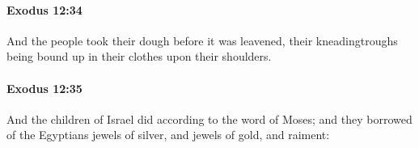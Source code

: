 		\paragraph{Exodus 12:34} %
			\label{EXODUS-12-34}

			And the people took their dough before it was leavened, their kneadingtroughs being bound up in their clothes upon their shoulders.


		\paragraph{Exodus 12:35} %
			\label{EXODUS-12-35}

			And the children of Israel did according to the word of Moses; and they borrowed of the Egyptians jewels of silver, and jewels of gold, and raiment:


